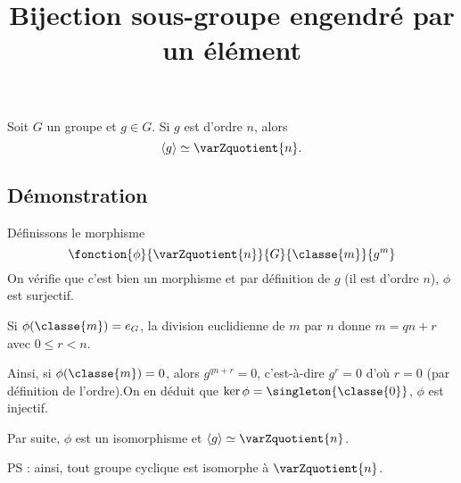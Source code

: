 \documentclass[fontsize=12pt,twoside=false,parskip=half, french]{scrartcl}
\title{Bijection sous-groupe engendré par un élément}
\date{}
\author{}
\begin{document}
\maketitle
   \begin{Theoreme}
      Soit $G$ un groupe et $g \in G$. Si $g$ est d’ordre $n$, alors 
      \[
         \langle g \rangle \simeq \varZquotient{n}.
      \]
   \end{Theoreme}
   \subsection{Démonstration}
      Définissons le morphisme
      \[
         \fonction{\phi}{\varZquotient{n}}{G}{\classe{m}}{g^m}
      \]
      On vérifie que c’est bien un morphisme et par définition de $g$ 
      (il est d’ordre $n$), $\phi$ est surjectif.
      
      Si $\phi(\classe{m}) = e_G$, la division euclidienne de $m$ par $n$ donne
      $m = qn + r$ avec $0 \leq r < n$.
      
      Ainsi, si $\phi(\classe{m}) = 0$, alors $g^{qn + r} = 0$, c’est-à-dire
      $g^r = 0$ d’où $r = 0$ (par définition de l’ordre).On en déduit que 
      $\ker \phi = \singleton{\classe{0}}$, $\phi$ est injectif.
      
      Par suite, $\phi$ est un isomorphisme et $\langle g \rangle \simeq \varZquotient{n}$.
      
      PS : ainsi, tout groupe cyclique est isomorphe à $\varZquotient{n}$.
\end{document}
